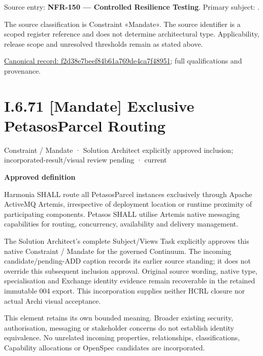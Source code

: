 Source entry: \textbf{NFR-150 — Controlled Resilience Testing}. Primary subject: \texttt{}.



The source classification is Constraint «Mandate». The source identifier is a scoped register reference and does not determine architectural type. Applicability, release scope and unresolved thresholds remain as stated above.


{\footnotesize \href{../../../../../../../../continuum/motivation/constraint/mandate/f2d38e7beef84b61a769de4ca7f48951.md}{Canonical record: f2d38e7beef84b61a769de4ca7f48951}; full qualifications and provenance.}\par
\section*{I.6.71 [Mandate] Exclusive PetasosParcel Routing}
\label{navigation:I.6.71}

\label{element:e024703b32c5437481ce290e8e50b079}
{\small Constraint / Mandate · Solution Architect explicitly approved inclusion; incorporated-result/visual review pending · current}\par

\par\medskip\textbf{Approved definition}\par


Harmonia SHALL route all PetasosParcel instances exclusively through Apache ActiveMQ Artemis, irrespective of deployment location or runtime proximity of participating components. Petasos SHALL utilise Artemis native messaging capabilities for routing, concurrency, availability and delivery management.



The Solution Architect's complete Subject/Views Task explicitly approves this
native Constraint / Mandate for the governed Continuum.
The incoming candidate/pending-ADD caption records its earlier source standing;
it does not override this subsequent inclusion approval. Original source wording,
native type, specialisation and Exchange identity evidence remain recoverable in
the retained immutable 004 export. This incorporation supplies neither HCRL closure
nor actual Archi visual acceptance.



This element retains its own bounded meaning. Broader existing security,
authorisation, messaging or stakeholder concerns do not establish identity
equivalence. No unrelated incoming properties, relationships, classifications,
Capability allocations or OpenSpec candidates are incorporated.


